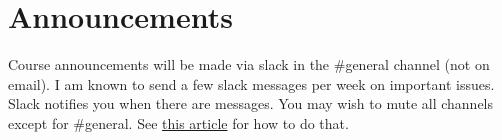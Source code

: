
\section*{Announcements}

Course announcements will be made via slack in the \#general channel (not on email). I am known to send a few slack messages per week on important issues.  Slack notifies you when there are messages. You may wish to mute all channels except for \#general. See \href{https://slack.com/help/articles/204411433-Mute-channels-and-direct-messages}{this article} for how to do that.